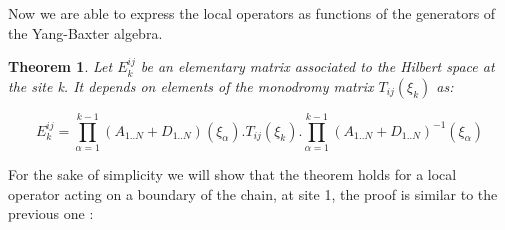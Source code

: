 \documentclass[12pt]{article}
\newtheorem{theo}{Theorem}[section]
\begin{document}



Now we are able to express the local operators as functions of the generators of the Yang-Baxter algebra.
\begin{theo}
Let $E_{k}^{ij}$ be an elementary matrix associated to the Hilbert space at the site k.
It depends on elements of the monodromy matrix $T_{ij}(\xi_k)$ as:

\begin{equation}
E_{k}^{ij}=\prod_{\alpha=1}^{k-1}(A_{1..N}+D_{1..N})(\xi_{\alpha}) . T_{ij}(\xi_{k}) . \prod_{\alpha=1}^{k-1}(A_{1..N}+D_{1..N})^{-1}(\xi_{\alpha})
\end{equation}

\end{theo}
For the sake of simplicity we will show that the theorem holds for a local operator acting on a boundary of the chain, at site 1, the proof is similar to the previous one :
\end{document}

